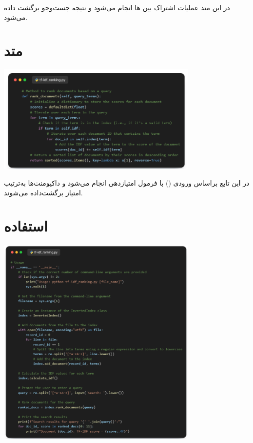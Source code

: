 \documentclass[12pt, dvipsnames, svgnames, x11names,]{article}
\begin{document}
		{\normalsize 
			در این متد عملیات اشتراک بین ها انجام می‌شود و نتیجه جست‌و‌جو برگشت داده می‌شود.
		}
		
	
	
		
	\section{متد }
	
		\begin{center}
			{\includegraphics[width=10cm]{images/06.png}}
		\end{center}
	
		{\normalsize 
			در این تابع براساس ورودی () با فرمول  امتیازدهی انجام می‌شود و داکیومنت‌ها به‌ترتیب امتیاز برگشت‌داده می‌شوند.	
		}
		
		
			
	\section{استفاده}
	
		\begin{center}
			{\includegraphics[width=10cm]{images/07.png}} \par
		\end{center}
	
\end{document}
